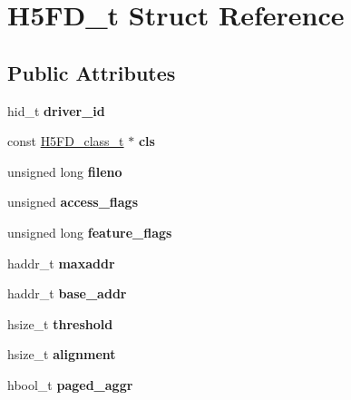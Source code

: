 \hypertarget{struct_h5_f_d__t}{}\section{H5\+F\+D\+\_\+t Struct Reference}
\label{struct_h5_f_d__t}
\subsection*{Public Attributes}
\begin{DoxyCompactItemize}
\item 
\mbox{\label{struct_h5_f_d__t_ab59472441e2754ed1163e4a0ae66c9ce}} 
hid\+\_\+t {\bfseries driver\+\_\+id}
\item 
\mbox{\label{struct_h5_f_d__t_ad27b3c6bc1f1a138c38d4340db957d11}} 
const \hyperlink{struct_h5_f_d__class__t}{H5\+F\+D\+\_\+class\+\_\+t} $\ast$ {\bfseries cls}
\item 
\mbox{\label{struct_h5_f_d__t_ad543506df7f2eaebba97f57e3a886e27}} 
unsigned long {\bfseries fileno}
\item 
\mbox{\label{struct_h5_f_d__t_a8b57c04535f8f052a46fc3b697b8a519}} 
unsigned {\bfseries access\+\_\+flags}
\item 
\mbox{\label{struct_h5_f_d__t_a407d943994c4e0cad7c709dd9785a93f}} 
unsigned long {\bfseries feature\+\_\+flags}
\item 
\mbox{\label{struct_h5_f_d__t_a11f472f97a328051bbc80a3563a3b3a3}} 
haddr\+\_\+t {\bfseries maxaddr}
\item 
\mbox{\label{struct_h5_f_d__t_a2027706ed6a7e4849b97d7da2e5d8fab}} 
haddr\+\_\+t {\bfseries base\+\_\+addr}
\item 
\mbox{\label{struct_h5_f_d__t_afcc9cd3a363c8fa1bd2a45c4e44af894}} 
hsize\+\_\+t {\bfseries threshold}
\item 
\mbox{\label{struct_h5_f_d__t_ac909e6b07487f988ec2751ec937c6ac6}} 
hsize\+\_\+t {\bfseries alignment}
\item 
\mbox{\label{struct_h5_f_d__t_a8b63c3d7e9e3aaeb062ea9876a79ba46}} 
hbool\+\_\+t {\bfseries paged\+\_\+aggr}
\end{DoxyCompactItemize}


